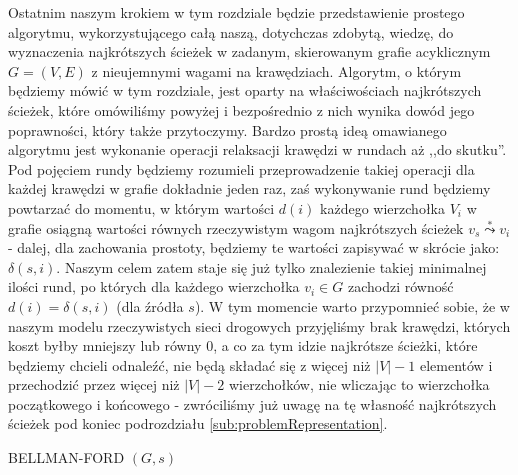 Ostatnim naszym krokiem w tym rozdziale będzie przedstawienie prostego algorytmu, wykorzystującego całą naszą, dotychczas zdobytą, wiedzę, do wyznaczenia najkrótszych ścieżek w zadanym, skierowanym grafie acyklicznym $G = \left( V, E \right)$ z nieujemnymi wagami na krawędziach. Algorytm, o którym będziemy mówić w tym rozdziale, jest oparty na właściwościach najkrótszych ścieżek, które omówiliśmy powyżej i bezpośrednio z nich wynika dowód jego poprawności, który także przytoczymy. Bardzo prostą ideą omawianego algorytmu jest wykonanie operacji relaksacji krawędzi w rundach aż ,,do skutku''. Pod pojęciem rundy będziemy rozumieli przeprowadzenie takiej operacji dla każdej krawędzi w grafie dokładnie jeden raz, zaś wykonywanie rund będziemy powtarzać do momentu, w którym wartości $ d \left( i \right) $ każdego wierzchołka $V_{i}$ w grafie osiągną wartości równych rzeczywistym wagom najkrótszych ścieżek $v_{s} \overset{*}\leadsto v_{i}$ - dalej, dla zachowania prostoty, będziemy te wartości zapisywać w skrócie jako: $ \delta \left( s, i \right)$. Naszym celem zatem staje się już tylko znalezienie takiej minimalnej ilości rund, po których dla każdego wierzchołka $ v_{i} \in G $ zachodzi równość $ d \left( i \right) = \delta \left( s, i \right) $ (dla źródła $ s $). W tym momencie warto przypomnieć sobie, że w naszym modelu rzeczywistych sieci drogowych przyjęliśmy brak krawędzi, których koszt byłby mniejszy lub równy $ 0 $, a co za tym idzie najkrótsze ścieżki, które będziemy chcieli odnaleźć, nie będą składać się z więcej niż $ \left| V \right| - 1 $ elementów i przechodzić przez więcej niż  $ \left| V \right| -2 $ wierzchołków, nie wliczając to wierzchołka początkowego i końcowego - zwróciliśmy już uwagę na tę własność najkrótszych ścieżek pod koniec podrozdziału \ref{sub:problemRepresentation}.

\begin{algorithm}[!htbp]
\DontPrintSemicolon
{}
\caption{ BELLMAN-FORD $\left( G, s \right)$\label{alg:BellmanFord}}
\end{algorithm}


